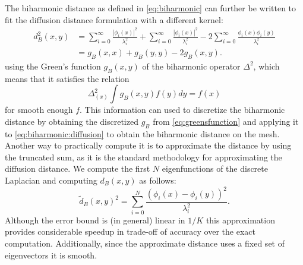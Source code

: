The biharmonic distance as defined in \eqref{eq:biharmonic} can further be written to fit the diffusion distance formulation with a different kernel:
\begin{equation}
	\begin{split}
		d_B^2(x,y) & = \sum_{i=0}^{\infty} \frac{|\phi_i(x)|^2}{\lambda_i^2} + \sum_{i=0}^{\infty} \frac{|\phi_i(x)|^2}{\lambda_i^2} - 2 \sum_{i=0}^{\infty} \frac{\phi_i(x) \phi_i(y)}{\lambda_i^2}\\
		& = g_B(x,x) + g_B(y,y) - 2g_B(x,y).
	\end{split}
	\label{eq:biharmonic:diffusion}
\end{equation}
using the Green's function $g_B(x,y)$ of the biharmonic operator $\Delta^2$, which means that it satisfies the relation
\begin{equation}
	\Delta_{(x)}^2 \int g_B(x,y)f(y)dy = f(x)
	\label{eq:greensfunction}
\end{equation}
for smooth enough $f$.
This information can used to discretize the biharmonic distance by obtaining the discretized $g_B$ from \eqref{eq:greensfunction} and applying it to \eqref{eq:biharmonic:diffusion} to obtain the biharmonic distance on the mesh.
Another way to practically compute it is to approximate the distance by using the truncated sum, as it is the standard methodology for approximating the diffusion distance.
We compute the first $N$ eigenfunctions of the discrete Laplacian and computing $d_B(x,y)$ as follows:
\begin{equation}
	\tilde{d}_B(x,y)^2 = \sum_{i=0}^N \frac{(\phi_i(x) - \phi_i(y))^2}{\lambda_i^2}.
	\label{eq:biharmonic:practical}
\end{equation}
Although the error bound is (in general) linear in $1/K$ this approximation provides considerable speedup in trade-off of accuracy over the exact computation.
Additionally, since the approximate distance uses a fixed set of eigenvectors it is smooth.


